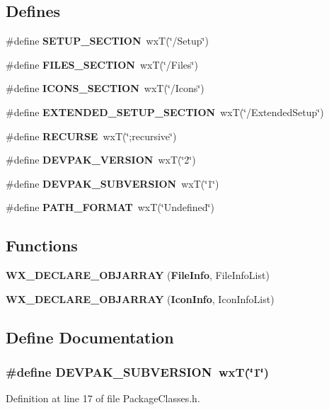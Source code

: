 \subsection*{Defines}
\begin{CompactItemize}
\item 
\#define {\bf SETUP\_\-SECTION}~wx\-T(\char`\"{}/Setup\char`\"{})
\item 
\#define {\bf FILES\_\-SECTION}~wx\-T(\char`\"{}/Files\char`\"{})
\item 
\#define {\bf ICONS\_\-SECTION}~wx\-T(\char`\"{}/Icons\char`\"{})
\item 
\#define {\bf EXTENDED\_\-SETUP\_\-SECTION}~wx\-T(\char`\"{}/Extended\-Setup\char`\"{})
\item 
\#define {\bf RECURSE}~wx\-T(\char`\"{};recursive\char`\"{})
\item 
\#define {\bf DEVPAK\_\-VERSION}~wx\-T(\char`\"{}2\char`\"{})
\item 
\#define {\bf DEVPAK\_\-SUBVERSION}~wx\-T(\char`\"{}1\char`\"{})
\item 
\#define {\bf PATH\_\-FORMAT}~wx\-T(\char`\"{}Undefined\char`\"{})
\end{CompactItemize}
\subsection*{Functions}
\begin{CompactItemize}
\item 
{\bf WX\_\-DECLARE\_\-OBJARRAY} ({\bf File\-Info}, File\-Info\-List)
\item 
{\bf WX\_\-DECLARE\_\-OBJARRAY} ({\bf Icon\-Info}, Icon\-Info\-List)
\end{CompactItemize}


\subsection{Define Documentation}
\subsubsection{\setlength{\rightskip}{0pt plus 5cm}\#define DEVPAK\_\-SUBVERSION~wx\-T(\char`\"{}1\char`\"{})}\label{_package_classes_8h_ef2a3a0d40714516c61e04581e8bc927}




Definition at line 17 of file Package\-Classes.h.

